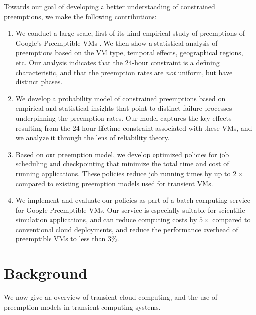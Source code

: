\documentclass[sigconf]{acmart} %
\newcommand{\subsecspace}[0]{-0.20cm}
\begin{document}
Towards our goal of developing a better understanding of constrained preemptions, we make the following contributions:
\begin{enumerate} [leftmargin=12pt]

\item We conduct a large-scale, first of its kind empirical study of preemptions of Google's Preemptible VMs \footnotemark. We then show a statistical analysis of preemptions based on the VM type, temporal effects, geographical regions, etc. Our analysis 
  indicates that the 24-hour constraint is a defining characteristic, and that the preemption rates are \emph{not} uniform, but have distinct phases. 

\item We develop a probability model of constrained preemptions based on empirical and statistical insights that point to distinct failure processes underpinning the preemption rates. Our model captures the key effects resulting from the 24 hour lifetime constraint associated with these VMs, and we analyze it through the lens of reliability theory.

\item Based on our preemption model, we develop optimized policies for job scheduling and checkpointing that minimize the total time and cost of running applications. These policies reduce job running times by up to $2\times$ compared to existing preemption models used for transient VMs. 
  
\item We implement and evaluate our policies as part of a batch computing service for Google Preemptible VMs. Our service is especially suitable for scientific simulation applications, and can reduce computing costs by $5\times$ compared to conventional cloud deployments, and reduce the performance overhead of preemptible VMs to less than $3\%$. 

\end{enumerate}


\vspace*{\subsecspace}
\section{Background}

We now give an overview of transient cloud computing, and the  use of preemption models in transient computing systems. 
\end{document}
